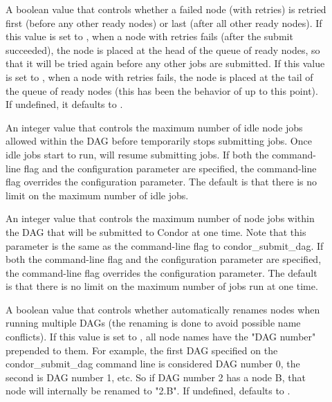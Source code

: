 \begin{description}
\item[]
\label{param:DAGManRetryNodeFirst}
A boolean value that controls whether a failed node (with retries)
is retried first (before any other ready nodes) or last (after all
other ready nodes).  If this value is set to , when a
node with retries fails (after the submit succeeded), the node is
placed at the head of the queue of ready nodes, so that it will be
tried again before any other jobs are submitted.  If this value is
set to , when a node with retries fails, the node
is placed at the tail of the queue of ready nodes (this has been the
behavior of  up to this point).  If undefined, it
defaults to .

\item[]
\label{param:DAGManMaxJobsIdle}
An integer value that controls the maximum number of idle node jobs
allowed within the DAG before  temporarily stops
submitting jobs.  Once idle jobs start to run,  will
resume submitting jobs.  If both the command-line flag and the
configuration parameter are specified, the command-line flag overrides
the configuration parameter.  The default is that there is no limit
on the maximum number of idle jobs.

\item[]
\label{param:DAGManMaxJobsSubmitted}
An integer value that controls the maximum number of node jobs within the
DAG that will  be submitted to Condor at one time.  Note that this
parameter is the same as the  command-line flag
to condor\_submit\_dag.  If both the command-line flag and the
configuration parameter are specified, the command-line flag overrides
the configuration parameter.  The default is that there is no limit
on the maximum number of jobs run at one time.

\item[]
\label{param:DAGManMungeNodeNames}
A boolean value that controls whether  automatically
renames nodes when running multiple DAGs (the renaming is done to
avoid possible name conflicts).  If this value is set to ,
all node names have the "DAG number" prepended to them.  For example,
the first DAG specified on the condor\_submit\_dag command line is
considered DAG number 0, the second is DAG number 1, etc.  So if
DAG number 2 has a node B, that node will internally be renamed
to "2.B".
If undefined,  defaults to .


\end{description}
